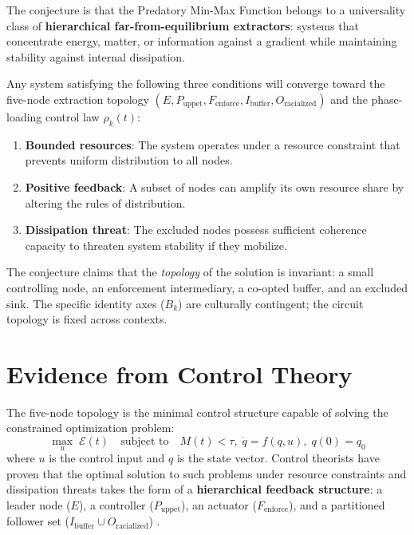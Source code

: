 The conjecture is that the Predatory Min-Max Function belongs to a universality class of \textbf{hierarchical far-from-equilibrium extractors}: systems that concentrate energy, matter, or information against a gradient while maintaining stability against internal dissipation.

\begin{conjecture}
\label{conj:universality}
Any system satisfying the following three conditions will converge toward the five-node extraction topology $(E, P_{\text{uppet}}, F_{\text{enforce}}, I_{\text{buffer}}, O_{\text{racialized}})$ and the phase-loading control law $\rho_k(t)$:
\begin{enumerate}
    \item \textbf{Bounded resources}: The system operates under a resource constraint that prevents uniform distribution to all nodes.
    \item \textbf{Positive feedback}: A subset of nodes can amplify its own resource share by altering the rules of distribution.
    \item \textbf{Dissipation threat}: The excluded nodes possess sufficient coherence capacity to threaten system stability if they mobilize.
\end{enumerate}
\end{conjecture}

The conjecture claims that the \textit{topology} of the solution is invariant: a small controlling node, an enforcement intermediary, a co-opted buffer, and an excluded sink. The specific identity axes ($B_k$) are culturally contingent; the circuit topology is fixed across contexts.

\section{Evidence from Control Theory}

The five-node topology is the minimal control structure capable of solving the constrained optimization problem:
\begin{equation}\label{eq:app-universality-objective}
\max_{u} \; \mathcal{E}(t) \quad \text{subject to} \quad M(t) < \tau, \; \dot{q} = f(q, u), \; q(0) = q_0
\end{equation}
where $u$ is the control input and $q$ is the state vector. Control theorists have proven that the optimal solution to such problems under resource constraints and dissipation threats takes the form of a \textbf{hierarchical feedback structure}: a leader node ($E$), a controller ($P_{\text{uppet}}$), an actuator ($F_{\text{enforce}}$), and a partitioned follower set ($I_{\text{buffer}} \cup O_{\text{racialized}}$) \cite{slotine_li, khalil_nonlinear}.

